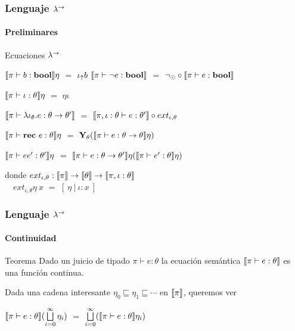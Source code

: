\documentclass{beamer}
\begin{document}
\begin{frame}
\frametitle{Lenguaje $\lambda^{\rightarrow}$}
\framesubtitle{Preliminares}

\begin{block}{Ecuaciones $\lambda^{\rightarrow}$}
\begin{center}
$\llbracket \pi \vdash b : \textbf{bool} \rrbracket \eta$ $=$ $\iota_{\uparrow} b$ \quad \quad \quad
$\llbracket \pi \vdash \neg e : \textbf{bool} \rrbracket$ $=$ $\neg_{\odot} \circ \llbracket \pi \vdash e : \textbf{bool} \rrbracket$
\end{center}

\begin{center}
$\llbracket \pi \vdash \iota : \theta \rrbracket\eta$ $=$ $\eta \iota$
\end{center}

\begin{center}
$\llbracket \pi \vdash \lambda \iota_{\theta} . e : \theta \rightarrow \theta' \rrbracket$ $=$
		$\llbracket \pi,\iota:\theta \vdash e : \theta' \rrbracket \circ ext_{\iota,\theta}$
\end{center}

\begin{center}
$\llbracket \pi \vdash \textbf{rec} \ e : \theta \rrbracket\eta$ $=$ $\textbf{Y}_{\theta} (\llbracket \pi \vdash e : \theta \rightarrow \theta \rrbracket\eta)$
\end{center}

\begin{center}
$\llbracket \pi \vdash ee' : \theta' \rrbracket\eta$ $=$ $\llbracket \pi \vdash e : \theta \rightarrow \theta' \rrbracket\eta (\llbracket \pi \vdash e' : \theta \rrbracket\eta)$
\end{center}

\end{block}

donde 
$ext_{\iota,\theta} : \llbracket \pi \rrbracket 
					  \rightarrow \llbracket \theta \rrbracket \rightarrow \llbracket \pi,\iota:\theta \rrbracket$\\
\quad \quad \ \
$ext_{\iota,\theta} \eta \ x$ $=$ $[\ \eta \ | \ \iota:x \ ]$
\end{frame}

\begin{frame}
\frametitle{Lenguaje $\lambda^{\rightarrow}$}
\framesubtitle{Continuidad}

\begin{block}{Teorema}
Dado un juicio de tipado $\pi \vdash e : \theta$ la ecuaci\'on sem\'antica
$\llbracket \pi \vdash e : \theta \rrbracket$ es una funci\'on continua.
\end{block}

\pause

\begin{block}{}
Dada una cadena interesante
$\eta_0 \sqsubseteq \eta_1 \sqsubseteq \cdots$ en $\llbracket \pi \rrbracket$, queremos ver

\begin{center}
$\llbracket \pi \vdash e : \theta \rrbracket(\bigsqcup\limits^{\infty}_{i=0} \eta_i)$
$=$ $\bigsqcup\limits^{\infty}_{i=0} (\llbracket \pi \vdash e : \theta \rrbracket\eta_i)$
\end{center}

\end{block}

\end{frame}
\end{document}

